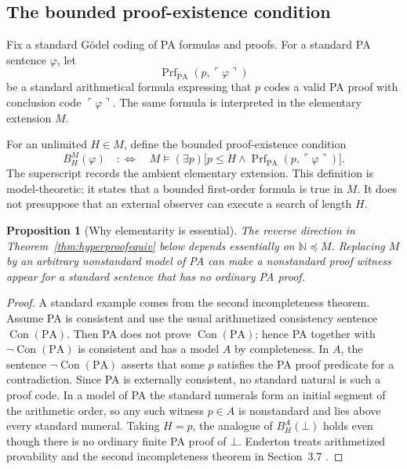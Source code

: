 \documentclass[11pt,openany]{book}
\newtheorem{proposition}[theorem]{Proposition}
\theoremstyle{definition}
\theoremstyle{remark}
\newcommand{\N}{\mathbb{N}}
\newcommand{\Prf}{\operatorname{Prf}}
\begin{document}
\subsection{The bounded proof-existence condition}
Fix a standard G\"odel coding of PA formulas and proofs. For a standard PA sentence \(\varphi\), let
\[
\Prf_{\mathrm{PA}}(p,\ulcorner\varphi\urcorner)
\]
be a standard arithmetical formula expressing that \(p\) codes a valid PA proof with conclusion code \(\ulcorner\varphi\urcorner\). The same formula is interpreted in the elementary extension \(M\).

For an unlimited \(H\in M\), define the bounded proof-existence condition
\[
B_H^M(\varphi)
\quad:\Longleftrightarrow\quad
M\models
(\exists p)\bigl[p\le H\wedge\Prf_{\mathrm{PA}}(p,\ulcorner\varphi\urcorner)\bigr].
\]
The superscript records the ambient elementary extension. This definition is model-theoretic: it states that a bounded first-order formula is true in \(M\). It does not presuppose that an external observer can execute a search of length \(H\).

\begin{proposition}[Why elementarity is essential]\label{prop:elementarity-essential}
The reverse direction in Theorem~\ref{thm:hyperproofequiv} below depends essentially on \(\N\preccurlyeq M\). Replacing \(M\) by an arbitrary nonstandard model of PA can make a nonstandard proof witness appear for a standard sentence that has no ordinary PA proof.
\end{proposition}
\begin{proof}
A standard example comes from the second incompleteness theorem. Assume PA is consistent and use the usual arithmetized consistency sentence \(\operatorname{Con}(\mathrm{PA})\). Then PA does not prove \(\operatorname{Con}(\mathrm{PA})\); hence PA together with \(\neg\operatorname{Con}(\mathrm{PA})\) is consistent and has a model \(A\) by completeness. In \(A\), the sentence \(\neg\operatorname{Con}(\mathrm{PA})\) asserts that some \(p\) satisfies the PA proof predicate for a contradiction. Since PA is externally consistent, no standard natural is such a proof code. In a model of PA the standard numerals form an initial segment of the arithmetic order, so any such witness \(p\in A\) is nonstandard and lies above every standard numeral. Taking \(H=p\), the analogue of \(B_H^A(\bot)\) holds even though there is no ordinary finite PA proof of \(\bot\). Enderton treats arithmetized provability and the second incompleteness theorem in Section~3.7 \cite{EndertonLogic}.
\end{proof}
\end{document}

